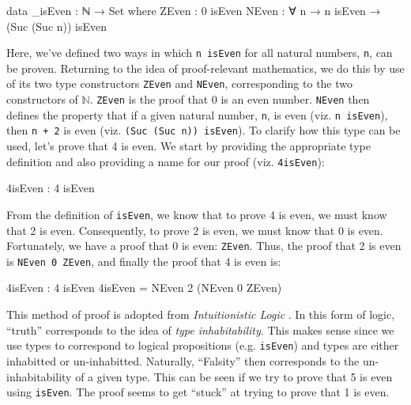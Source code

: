 \documentclass[12pt]{article}
\begin{document}
\begin{center}
\begin{minipage}{0.7\textwidth}
\begin{code}
data _isEven : ℕ → Set where
  ZEven : 0 isEven
  NEven : ∀ n → n isEven → (Suc (Suc n)) isEven
\end{code}
\end{minipage}
\end{center}
Here, we've defined two ways in which {\tt n isEven} for all natural numbers,
{\tt n}, can be proven. Returning to the idea of proof-relevant mathematics,
we do this by use of its two type constructors {\tt ZEven} and {\tt NEven},
corresponding to the two constructors of \(\mathbb{N}\). {\tt ZEven} is the
proof that 0 is an even number. {\tt NEven} then defines the property that if
a given natural number, {\tt n}, is even (viz. {\tt n isEven}), then {\tt n + 2}
is even (viz. {\tt (Suc (Suc n)) isEven}). To clarify how this type can be used,
let's prove that 4 is even. We start by providing the appropriate type definition
and also providing a name for our proof (viz. {\tt 4isEven}):
\begin{center}
\begin{minipage}{0.5\textwidth}
\begin{code}
4isEven : 4 isEven
\end{code}
\end{minipage}
\end{center}
From the definition of {\tt isEven}, we know that to prove 4 is even, we must
know that 2 is even. Consequently, to prove 2 is even, we must know that 0 is
even. Fortunately, we have a proof that 0 is even: {\tt ZEven}. Thus, the proof
that 2 is even is {\tt NEven 0 ZEven}, and finally the proof that 4 is even is:
\begin{center}
\begin{minipage}{0.5\textwidth}
\begin{code}
4isEven : 4 isEven
4isEven = NEven 2 (NEven 0 ZEven)
\end{code}
\end{minipage}
\end{center}

This method of proof is adopted from {\em Intuitionistic Logic} \cite{}. In
this form of logic, ``truth'' corresponds to the idea of {\em type inhabitability}.
This makes sense since we use types to correspond to logical propositions
(e.g. {\tt isEven}) and types are either inhabitted or un-inhabitted. Naturally,
``Falsity'' then corresponds to the un-inhabitability of a given type. This can
be seen if we try to prove that 5 is even using {\tt isEven}. The proof seems to
get ``stuck'' at trying to prove that 1 is even.
\end{document}

